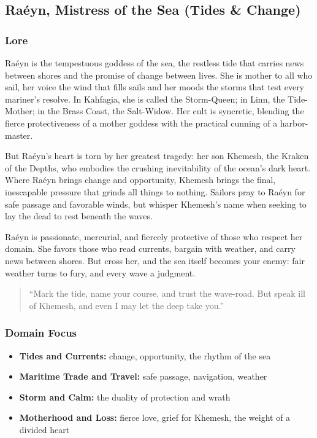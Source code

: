 
\subsection{Raéyn, Mistress of the Sea (Tides \& Change)}

\subsubsection*{Lore}
Raéyn is the tempestuous goddess of the sea, the restless tide that carries news between shores and the promise of change between lives. She is mother to all who sail, her voice the wind that fills sails and her moods the storms that test every mariner's resolve. In Kahfagia, she is called the Storm-Queen; in Linn, the Tide-Mother; in the Brass Coast, the Salt-Widow. Her cult is syncretic, blending the fierce protectiveness of a mother goddess with the practical cunning of a harbor-master.

But Raéyn's heart is torn by her greatest tragedy: her son Khemesh, the Kraken of the Depths, who embodies the crushing inevitability of the ocean's dark heart. Where Raéyn brings change and opportunity, Khemesh brings the final, inescapable pressure that grinds all things to nothing. Sailors pray to Raéyn for safe passage and favorable winds, but whisper Khemesh's name when seeking to lay the dead to rest beneath the waves.

Raéyn is passionate, mercurial, and fiercely protective of those who respect her domain. She favors those who read currents, bargain with weather, and carry news between shores. But cross her, and the sea itself becomes your enemy: fair weather turns to fury, and every wave a judgment.

\begin{quote}
``Mark the tide, name your course, and trust the wave-road. But speak ill of Khemesh, and even I may let the deep take you.''
\end{quote}

\subsubsection*{Domain Focus}
\begin{itemize}
  \item \textbf{Tides and Currents:} change, opportunity, the rhythm of the sea
  \item \textbf{Maritime Trade and Travel:} safe passage, navigation, weather
  \item \textbf{Storm and Calm:} the duality of protection and wrath
  \item \textbf{Motherhood and Loss:} fierce love, grief for Khemesh, the weight of a divided heart
\end{itemize}

